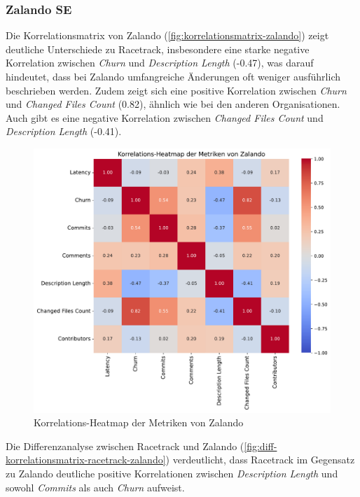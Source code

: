 \newpage

\subsubsection{Zalando SE}
Die Korrelationsmatrix von Zalando (\autoref{fig:korrelationsmatrix-zalando}) zeigt deutliche Unterschiede zu Racetrack, insbesondere eine starke negative Korrelation zwischen \textit{Churn} und \textit{Description Length} (-0.47), was darauf hindeutet, dass bei Zalando umfangreiche Änderungen oft weniger ausführlich beschrieben werden. Zudem zeigt sich eine positive Korrelation zwischen \textit{Churn} und \textit{Changed Files Count} (0.82), ähnlich wie bei den anderen Organisationen. Auch gibt es eine negative Korrelation zwischen \textit{Changed Files Count} und \textit{Description Length} (-0.41).

\begin{figure}[htbp]
    \includegraphics[width=\textwidth]{Figures/zalando-korrelationsmatrix.pdf}
    \caption{Korrelations-Heatmap der Metriken von Zalando}
    \label{fig:korrelationsmatrix-zalando}
\end{figure}

\newpage
Die Differenzanalyse zwischen Racetrack und Zalando (\autoref{fig:diff-korrelationsmatrix-racetrack-zalando}) verdeutlicht, dass Racetrack im Gegensatz zu Zalando deutliche positive Korrelationen zwischen \textit{Description Length} und sowohl \textit{Commits} als auch \textit{Churn} aufweist.

